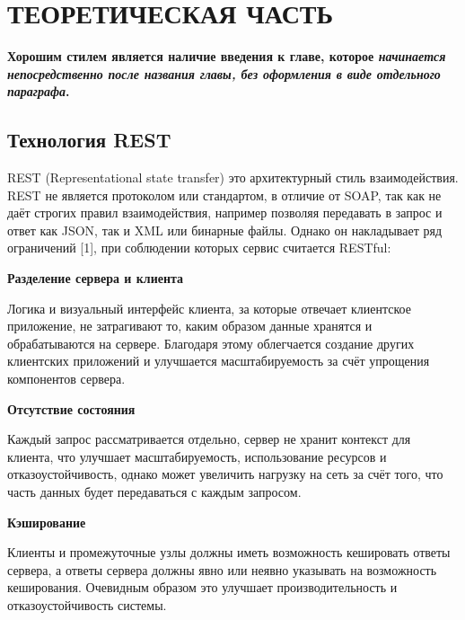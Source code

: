 \chapter{ТЕОРЕТИЧЕСКАЯ ЧАСТЬ} \label{ch:ch1}


\textbf{Хорошим стилем является наличие введения к главе, которое \textit{начинается непосредственно после названия главы, без оформления в виде отдельного параграфа}.}


\section{Технология REST}\label{sec:rest}

REST (Representational state transfer) это архитектурный стиль взаимодействия.
REST не является протоколом или стандартом, в отличие от SOAP, так как не даёт строгих правил взаимодействия, например позволяя передавать в запрос и ответ как JSON, так и XML или бинарные файлы.
Однако он накладывает ряд ограничений [1], при соблюдении которых сервис считается RESTful:

\textbf{Разделение сервера и клиента}

Логика и визуальный интерфейс клиента, за которые отвечает клиентское приложение, не затрагивают то, каким образом данные хранятся и обрабатываются на сервере.
Благодаря этому облегчается создание других клиентских приложений и улучшается масштабируемость за счёт упрощения компонентов сервера.

\textbf{Отсутствие состояния}

Каждый запрос рассматривается отдельно, сервер не хранит контекст для клиента, что улучшает масштабируемость, использование ресурсов и отказоустойчивость, однако может увеличить нагрузку на сеть за счёт того, что часть данных будет передаваться с каждым запросом.

\textbf{Кэширование}

Клиенты и промежуточные узлы должны иметь возможность кешировать ответы сервера, а ответы сервера должны явно или неявно указывать на возможность кеширования.
Очевидным образом это улучшает производительность и отказоустойчивость системы.

